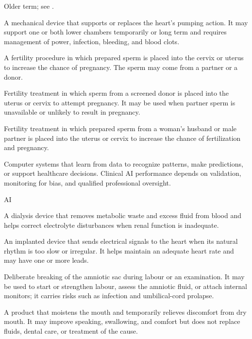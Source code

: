  Older term; see .

 A mechanical device that supports or replaces the heart’s pumping action. It may support one or both lower chambers temporarily or long term and requires management of power, infection, bleeding, and blood clots.

 A fertility procedure in which prepared sperm is placed into the cervix or uterus to increase the chance of pregnancy. The sperm may come from a partner or a donor.

 Fertility treatment in which sperm from a screened donor is placed into the uterus or cervix to attempt pregnancy. It may be used when partner sperm is unavailable or unlikely to result in pregnancy.

 Fertility treatment in which prepared sperm from a woman’s husband or male partner is placed into the uterus or cervix to increase the chance of fertilization and pregnancy.

 Computer systems that learn from data to recognize patterns, make predictions, or support healthcare decisions. Clinical AI performance depends on validation, monitoring for bias, and qualified professional oversight.

\synonyms
AI

 A dialysis device that removes metabolic waste and excess fluid from blood and helps correct electrolyte disturbances when renal function is inadequate.

 An implanted device that sends electrical signals to the heart when its natural rhythm is too slow or irregular. It helps maintain an adequate heart rate and may have one or more leads.

 Deliberate breaking of the amniotic sac during labour or an examination. It may be used to start or strengthen labour, assess the amniotic fluid, or attach internal monitors; it carries risks such as infection and umbilical-cord prolapse.

 A product that moistens the mouth and temporarily relieves discomfort from dry mouth. It may improve speaking, swallowing, and comfort but does not replace fluids, dental care, or treatment of the cause.

